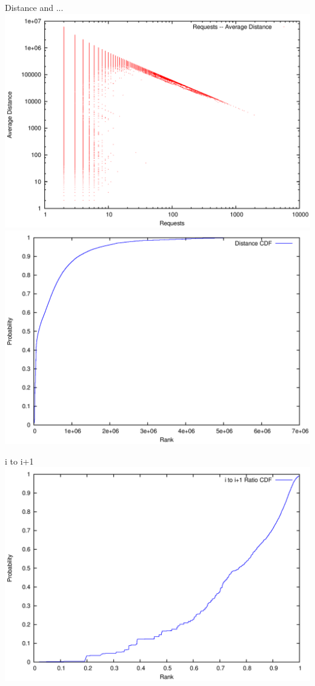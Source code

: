 \documentclass{beamer}
\begin{document}
\begin{frame}{Distance and ...}
\includegraphics[scale=0.4]{fig/freq_dist.png}\hspace*{0.1cm}
\includegraphics[scale=0.4]{fig/distance_cdf.png}
\end{frame}
\begin{frame}{i to i+1}
\includegraphics[scale=0.67]{fig/i_to_next_ratio_cdf.png}
\end{frame}
\end{document}
